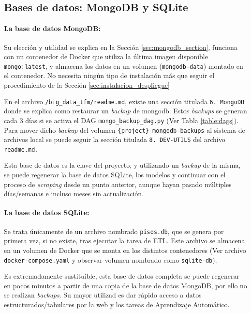 \clearpage
\subsection{Bases de datos: MongoDB y SQLite}

\paragraph{La base de datos MongoDB: }Su elección y utilidad se explica en la Sección \ref{sec:mongodb_section}, funciona con un contenedor de Docker que utiliza la última imagen disponible \texttt{mongo:latest}, y almacena los datos en un volumen (\texttt{mongodb-data}) montado en el contenedor. No necesita ningún tipo de instalación más que seguir el procedimiento de la Sección \ref{sec:instalacion_despliegue}

En el archivo \texttt{/big\_data\_tfm/readme.md}, existe una sección titulada \texttt{6. MongoDB} donde se explica como restaurar un \textit{backup} de mongodb. Estos \textit{backups} se generan cada 3 días si se activa el DAG \texttt{mongo\_backup\_dag.py} (Ver Tabla \ref{table:dags}). Para mover dicho \textit{backup} del volumen \texttt{\{project\}\_mongodb-backups} al sistema de archivos local se puede seguir la sección titulada \texttt{8. DEV-UTILS} del archivo \texttt{readme.md.}

Esta base de datos es la clave del proyecto, y utilizando un \textit{backup} de la misma, se puede regenerar la base de datos SQLite, los modelos y continuar con el proceso de \textit{scraping} desde un punto anterior, aunque hayan pasado múltiples días/semanas e incluso meses sin actualización.

\paragraph{La base de datos SQLite: } Se trata únicamente de un archivo nombrado \texttt{pisos.db}, que se genera por primera vez, si no existe, tras ejecutar la tarea de ETL. Este archivo se almacena en un volumen de Docker que se monta en los distintos contenedores (Ver archivo \texttt{docker-compose.yaml} y observar volumen nombrado como \texttt{sqlite-db}).

Es extremadamente sustituible, esta base de datos completa se puede regenerar en pocos minutos a partir de una copia de la base de datos MongoDB, por ello no se realizan \textit{backups}. Su mayor utilizad es dar rápido acceso a datos estructurados/tabulares por la web y los tareas de Aprendizaje Automático.

